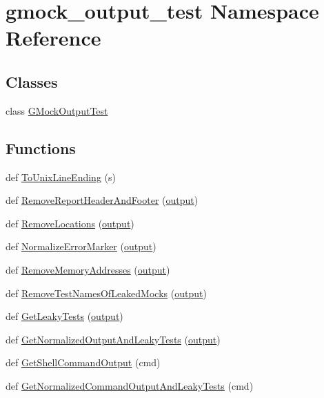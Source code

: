\hypertarget{namespacegmock__output__test}{}\section{gmock\+\_\+output\+\_\+test Namespace Reference}
\label{namespacegmock__output__test}
\subsection*{Classes}
\begin{DoxyCompactItemize}
\item 
class \hyperlink{classgmock__output__test_1_1GMockOutputTest}{G\+Mock\+Output\+Test}
\end{DoxyCompactItemize}
\subsection*{Functions}
\begin{DoxyCompactItemize}
\item 
def \hyperlink{namespacegmock__output__test_a5c9ae3611cc4fac1e1340a3345865cf3}{To\+Unix\+Line\+Ending} (s)
\item 
def \hyperlink{namespacegmock__output__test_a2ebfc0abfb0ed307021ecaa9da465c55}{Remove\+Report\+Header\+And\+Footer} (\hyperlink{namespacegmock__output__test_a4277f8598ba3835393fe82e82d09375d}{output})
\item 
def \hyperlink{namespacegmock__output__test_aa3c93f8085ff0886bf0d160d71af2452}{Remove\+Locations} (\hyperlink{namespacegmock__output__test_a4277f8598ba3835393fe82e82d09375d}{output})
\item 
def \hyperlink{namespacegmock__output__test_af3c1f95f19b9f048843a2d562d459b24}{Normalize\+Error\+Marker} (\hyperlink{namespacegmock__output__test_a4277f8598ba3835393fe82e82d09375d}{output})
\item 
def \hyperlink{namespacegmock__output__test_a58b4fdb82b40d01d32b09d4c14ba11a5}{Remove\+Memory\+Addresses} (\hyperlink{namespacegmock__output__test_a4277f8598ba3835393fe82e82d09375d}{output})
\item 
def \hyperlink{namespacegmock__output__test_ac0628c5630d869dae45601df9d909638}{Remove\+Test\+Names\+Of\+Leaked\+Mocks} (\hyperlink{namespacegmock__output__test_a4277f8598ba3835393fe82e82d09375d}{output})
\item 
def \hyperlink{namespacegmock__output__test_a60299c4f0cb666d08f101ddaa7aabed4}{Get\+Leaky\+Tests} (\hyperlink{namespacegmock__output__test_a4277f8598ba3835393fe82e82d09375d}{output})
\item 
def \hyperlink{namespacegmock__output__test_a590ba3b918e5599eeabc2cbf597e2ce1}{Get\+Normalized\+Output\+And\+Leaky\+Tests} (\hyperlink{namespacegmock__output__test_a4277f8598ba3835393fe82e82d09375d}{output})
\item 
def \hyperlink{namespacegmock__output__test_a001498a3e9bf552ee429e434eb00cb08}{Get\+Shell\+Command\+Output} (cmd)
\item 
def \hyperlink{namespacegmock__output__test_a1796bc395fbfb8873992e3f84378e4bf}{Get\+Normalized\+Command\+Output\+And\+Leaky\+Tests} (cmd)
\end{DoxyCompactItemize}
